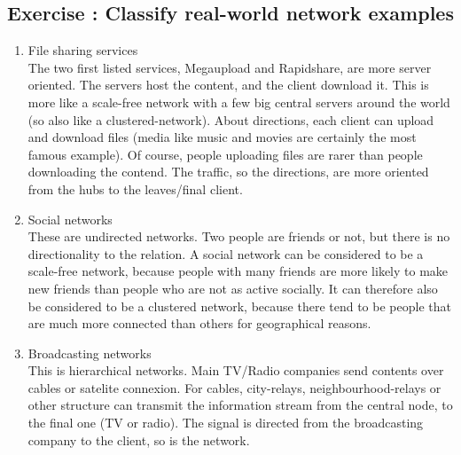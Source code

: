\documentclass[10pt,a4paper]{article}
\newcommand{\exercise}[1]
{
  \stepcounter{subsection}
  \subsection*{Exercise \thesubsection: #1}

}
\begin{document}
\newpage
\exercise{Classify real-world network examples}
\begin{enumerate}
	\item File sharing services\\
	
	 The two first listed services, Megaupload and Rapidshare, are more server oriented. The servers host the content, and the client download it. This is more like a scale-free network with a few big central servers around the world (so also like a clustered-network). About directions, each client can upload and download files (media like music and movies are certainly the most famous example). Of course, people uploading files are rarer than people downloading the contend. The traffic, so the directions, are more oriented from the hubs to the leaves/final client. 
	
	
	\item Social networks\\
	
	These are undirected networks. Two people are friends or not, but there is no directionality to
	the relation.
	A social network can be considered to be a scale-free network, because people with many
	friends are more likely to make new friends than people who are not as active socially. It can
	therefore also be considered to be a clustered network, because there tend to be people that
	are much more connected than others for geographical reasons.
	
	
	\item Broadcasting networks\\
	
	This is hierarchical networks. Main TV/Radio companies send contents over cables or satelite connexion. For cables, city-relays, neighbourhood-relays or other structure can transmit the information stream from the central node, to the final one (TV or radio). The signal is directed from the broadcasting company to the client, so is the network.   
	

\end{enumerate}
	
	
\end{document}
